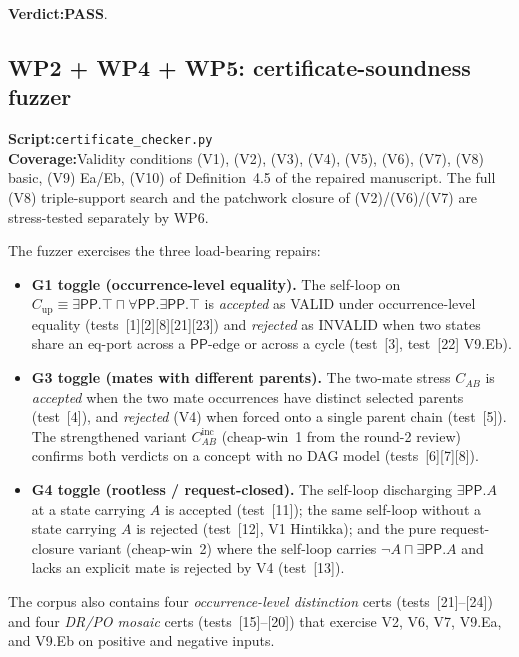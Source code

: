 \documentclass[11pt]{article}
\newcommand{\PP}{\mathsf{PP}}
\newcommand{\PASS}{\textcolor{black!70!green}{\textbf{PASS}}}
\begin{document}
\textbf{Verdict:}\quad \PASS{}.

\subsection{WP2 + WP4 + WP5: certificate-soundness fuzzer}

\textbf{Script:}\quad \texttt{certificate\_checker.py}\\
\textbf{Coverage:}\quad Validity conditions (V1), (V2), (V3),
(V4), (V5), (V6), (V7), (V8) basic, (V9) Ea/Eb, (V10) of
Definition~4.5 of the repaired manuscript.  The full (V8)
triple-support search and the patchwork closure of (V2)/(V6)/(V7)
are stress-tested separately by WP6.

The fuzzer exercises the three load-bearing repairs:
\begin{itemize}[leftmargin=2em]
  \item \textbf{G1 toggle (occurrence-level equality).}
    The self-loop on
    \(C_{\mathrm{up}} \equiv \exists\PP.\top \sqcap \forall\PP.\exists\PP.\top\)
    is \emph{accepted} as VALID under occurrence-level equality
    (tests~[1][2][8][21][23]) and \emph{rejected} as INVALID when
    two states share an eq-port across a \(\PP\)-edge or across a
    cycle (test~[3], test~[22] V9.Eb).
  \item \textbf{G3 toggle (mates with different parents).}
    The two-mate stress \(C_{AB}\) is \emph{accepted} when the two
    mate occurrences have distinct selected parents (test~[4]),
    and \emph{rejected} (V4) when forced onto a single parent
    chain (test~[5]).  The strengthened variant \(C_{AB}^{\mathrm{inc}}\)
    (cheap-win~1 from the round-2 review) confirms both verdicts
    on a concept with no DAG model (tests~[6][7][8]).
  \item \textbf{G4 toggle (rootless / request-closed).}
    The self-loop discharging \(\exists\PP.A\) at a state carrying
    \(A\) is accepted (test~[11]); the same self-loop without a
    state carrying \(A\) is rejected (test~[12], V1 Hintikka);
    and the pure request-closure variant (cheap-win~2) where
    the self-loop carries \(\neg A \sqcap \exists\PP.A\) and lacks
    an explicit mate is rejected by V4 (test~[13]).
\end{itemize}

The corpus also contains four \emph{occurrence-level distinction}
certs (tests~[21]--[24]) and four \emph{DR/PO mosaic} certs
(tests~[15]--[20]) that exercise V2, V6, V7, V9.Ea, and V9.Eb on
positive and negative inputs.
\end{document}
